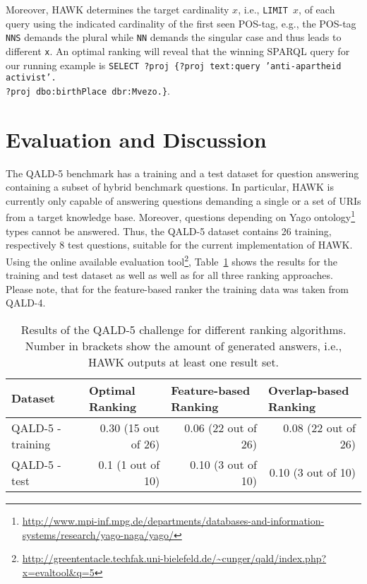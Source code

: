 \documentclass{llncs}
\begin{document}
Moreover, HAWK determines the target cardinality $x$, i.e., \texttt{LIMIT $x$}, of each query using the indicated cardinality of the first seen POS-tag, e.g., the POS-tag \texttt{NNS} demands the plural while \texttt{NN} demands the singular case and thus leads to different \texttt{x}.
An optimal ranking will reveal that the winning SPARQL query for our running example is \texttt{SELECT ?proj  \{?proj text:query 'anti-apartheid activist'.\\ ?proj dbo:birthPlace dbr:Mvezo.\}}.


\section{Evaluation and Discussion}
\label{sec:discussion}
\sloppy
The QALD-5 benchmark has a training and a test dataset for question answering containing a subset of hybrid benchmark questions.
In particular, HAWK is currently only capable of answering questions demanding a single or a set of URIs from a target knowledge base. 
Moreover, questions depending on Yago ontology\footnote{\url{http://www.mpi-inf.mpg.de/departments/databases-and-information-systems/research/yago-naga/yago/}} types cannot be answered.
Thus, the QALD-5 dataset contains 26 training, respectively 8 test questions, suitable for the current implementation of HAWK.
Using the online available evaluation tool\footnote{\url{http://greententacle.techfak.uni-bielefeld.de/~cunger/qald/index.php?x=evaltool&q=5}}, Table~\ref{tab:eval_qald5} shows the results for the training and test dataset as well as well as for all three ranking approaches.
Please note, that for the feature-based ranker the training data was taken from QALD-4.

\begin{table}[h]
\centering
\caption{Results of the QALD-5 challenge for different ranking algorithms. Number in brackets show the amount of generated answers, i.e., HAWK outputs at least one result set.}
\begin{tabular}{@{}lrrr@{}}
\toprule
Dataset           & \multicolumn{1}{l}{Optimal Ranking} & \multicolumn{1}{l}{Feature-based Ranking} & \multicolumn{1}{l}{Overlap-based Ranking} \\ \midrule
QALD-5 - training & 0.30 (15 out of 26)                 & 0.06 (22 out of 26)                       & 0.08 (22 out of 26)                       \\
QALD-5 - test     & 0.1 (1 out of 10)                   & 0.10 (3 out of 10)                        & 0.10 (3 out of 10)                        \\ \bottomrule
\end{tabular}
\label{tab:eval_qald5}
\end{table}
\end{document}
